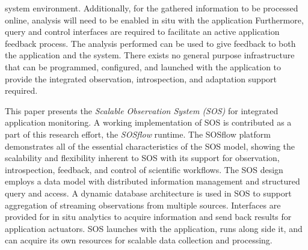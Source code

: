 system environment.
%
%
Additionally, for the gathered information to be processed online,
analysis will need to be enabled in situ with the application
%
%
Furthermore, query and control interfaces are required to facilitate
an active application feedback process.
%
The analysis performed can be used to give feedback to both the
application and the system.
%
There exists no general purpose infrastructure that can be programmed,
configured, and launched with the application to provide the
integrated observation, introspection, and adaptation support
required.
%
\par
%
This paper presents the \textit{Scalable Observation System (SOS)} for
integrated application monitoring.
%
A working implementation of SOS is contributed as a part of this
research effort, the \textit{SOSflow} runtime.
%
The SOSflow platform demonstrates all of the essential characteristics
of the SOS model, showing the scalability and flexibility inherent to
SOS with its support for observation, introspection, feedback, and
control of scientific workflows.
%
The SOS design employs a data model with distributed
information management and structured query and access.
%
A dynamic database architecture is used in SOS to support aggregation
of streaming observations from multiple sources.
%
%
Interfaces are provided for in situ analytics to acquire
information and send back results for application actuators.
%
SOS launches with the application, runs along side it, and can acquire
its own resources for scalable data collection and processing.
%


